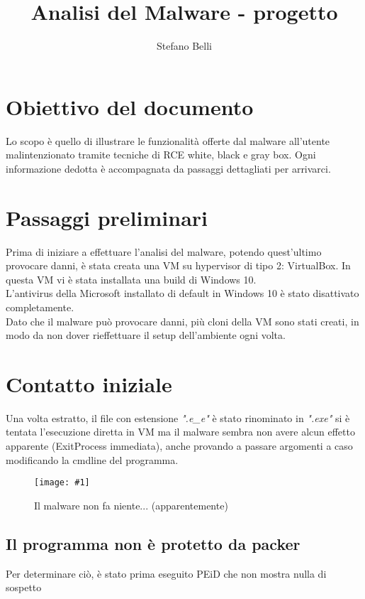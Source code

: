 \documentclass[
    a4paper, %
    11pt %
]{article}
\title{Analisi del Malware - progetto}
\date{}
\author{Stefano Belli}
\newcommand{\pic}[4]{\begin{figure}[H]
            \centering
            \texttt{[image: \#1]}
            \caption{#2}
            \label{fig:#1}
            \end{figure}}
\begin{document}
    \maketitle
    
    \tableofcontents

    \section*{Obiettivo del documento}
        Lo scopo è quello di illustrare le funzionalità offerte dal malware all'utente malintenzionato
        tramite tecniche di RCE white, black e gray box. Ogni informazione dedotta è accompagnata da passaggi
        dettagliati per arrivarci.

    \pagebreak

    \section{Passaggi preliminari}
        Prima di iniziare a effettuare l'analisi del malware, potendo quest'ultimo provocare danni,
        è stata creata una VM su hypervisor di tipo 2: VirtualBox. In questa VM vi è stata
        installata una build di Windows 10. \\ L'antivirus della Microsoft installato di default
        in Windows 10 è stato disattivato completamente. \\ Dato che il malware può provocare danni,
        più cloni della VM sono stati creati, in modo da non dover rieffettuare il setup dell'ambiente
        ogni volta.

    \section{Contatto iniziale}
        Una volta estratto, il file con estensione \textit{".e\_e"} è stato rinominato in \textit{".exe"}
        si è tentata l'esecuzione diretta in VM ma il malware sembra non
        avere alcun effetto apparente (ExitProcess immediata), 
        anche provando a passare argomenti a caso 
        modificando la cmdline del programma.

        \pic{firstapproach}{Il malware non fa niente... (apparentemente)}{14cm}{5cm}

        \subsection{Il programma non è protetto da packer}
            Per determinare ciò, è stato prima eseguito PEiD che non mostra nulla di sospetto
\end{document}
